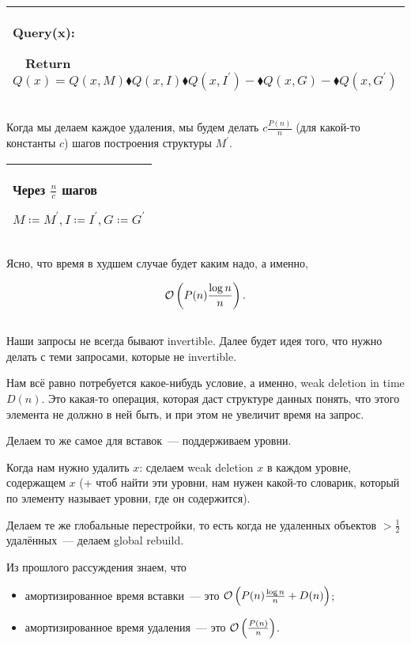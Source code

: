 \begin{tabular}{|p{11cm}|}
	\hline
	Query(x):

	$\quad$Return $Q(x) = Q(x, M) \blacklozenge Q(x, I) \blacklozenge Q(x, I^\prime) - \blacklozenge Q(x, G) - \blacklozenge Q(x, G^\prime)$ \\
	\hline
\end{tabular}


Когда мы делаем каждое удаления, мы будем делать $c\frac{P(n)}{n}$ (для какой-то константы $c$) шагов построения структуры $M^\prime$.


\begin{tabular}{|p{4cm}|}
	\hline
	Через $\frac{n}{c}$ шагов

	$M \coloneqq M^\prime, I \coloneqq I^\prime, G \coloneqq G^\prime$ \\
	\hline
\end{tabular}


Ясно, что время в худшем случае будет каким надо, а именно,

\begin{equation*}
	\mathcal{O}\left(P(n)\frac{\log n}{n} \right).
\end{equation*}

\subsection{}

Наши запросы не всегда бывают invertible. Далее будет идея того, что нужно делать с теми запросами, которые не invertible.

Нам всё равно потребуется какое-нибудь условие, а именно, weak deletion in time $D(n)$. Это какая-то операция, которая даст структуре данных понять, что этого элемента не должно в ней быть, и при этом не увеличит время на запрос.

Делаем то же самое для вставок~--- поддерживаем уровни.

Когда нам нужно удалить $x$: сделаем weak deletion $x$ в каждом уровне, содержащем $x$ (+ чтоб найти эти уровни, нам нужен какой-то словарик, который по элементу называет уровни, где он содержится).

Делаем те же глобальные перестройки, то есть когда не удаленных объектов $> \frac{1}{2}$ удалённых~--- делаем global rebuild.

Из прошлого рассуждения знаем, что

\begin{itemize}
	\item амортизированное время вставки~--- это $\mathcal{O}\left(P(n)\frac{\log n}{n} + D(n)\right)$;
	\item амортизированное время удаления~--- это $\mathcal{O}\left(\frac{P(n)}{n}\right)$.
\end{itemize}

